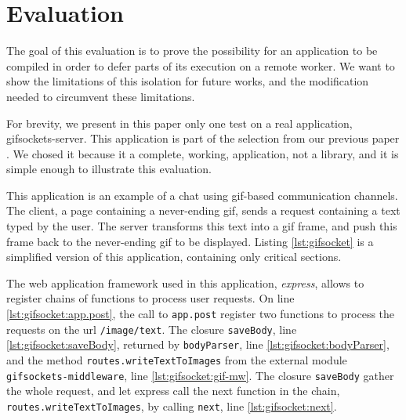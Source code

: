 \section{Evaluation} \label{section:evaluation}

The goal of this evaluation is to prove the possibility for an application to be compiled in order to defer parts of its execution on a remote worker.
We want to show the limitations of this isolation for future works, and the modification needed to circumvent these limitations.

For brevity, we present in this paper only one test on a real application, gifsockets-server.
This application is part of the selection from our previous paper \cite{Brodu2015}.
We chosed it because it a complete, working, application, not a library, and it is simple enough to illustrate this evaluation.

This application is an example of a chat using gif-based communication channels.
The client, a page containing a never-ending gif, sends a request containing a text typed by the user.
The server transforms this text into a gif frame, and push this frame back to the never-ending gif to be displayed.
Listing \ref{lst:gifsocket} is a simplified version of this application, containing only critical sections.

The web application framework used in this application, \textit{express}, allows to register chains of functions to process user requests.
On line \ref{lst:gifsocket:app.post}, the call to \texttt{app.post} register two functions to process the requests on the url \texttt{/image/text}.
The closure \texttt{saveBody}, line \ref{lst:gifsocket:saveBody}, returned by \texttt{bodyParser}, line \ref{lst:gifsocket:bodyParser}, and the method \texttt{routes.write\-Text\-To\-Images} from the external module \texttt{gifsockets-middleware}, line \ref{lst:gifsocket:gif-mw}.
The closure \texttt{saveBody} gather the whole request, and let express call the next function in the chain, \texttt{routes.write\-Text\-To\-Images}, by calling \texttt{next}, line \ref{lst:gifsocket:next}.


